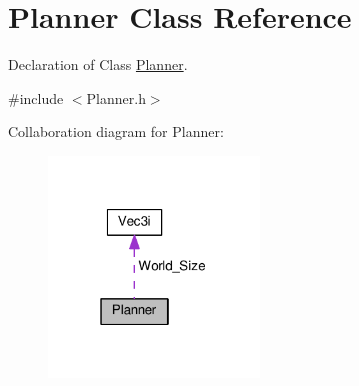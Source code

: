 \hypertarget{classPlanner}{}\section{Planner Class Reference}
\label{classPlanner}


Declaration of Class \hyperlink{classPlanner}{Planner}.  




{\ttfamily \#include $<$Planner.\+h$>$}



Collaboration diagram for Planner\+:\nopagebreak
\begin{figure}[H]
\begin{center}
\leavevmode
\includegraphics[width=159pt]{classPlanner__coll__graph}
\end{center}
\end{figure}
